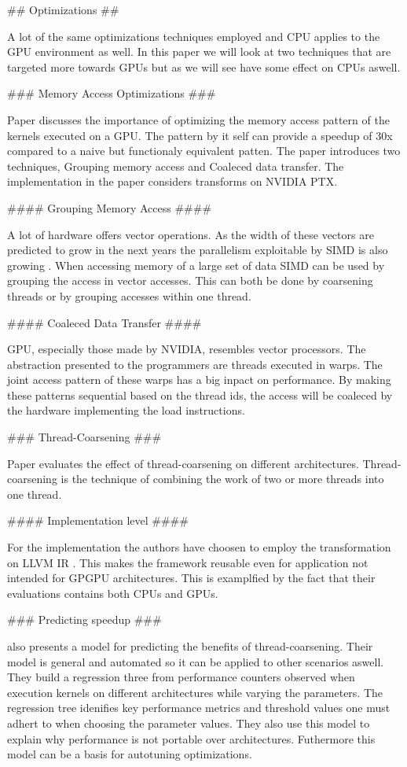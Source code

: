 \begin{markdown}

## Optimizations ##

A lot of the same optimizations techniques employed and CPU applies to
the GPU environment as well. In this paper we will look at two
techniques that are targeted more towards GPUs but as we will see have
some effect on CPUs aswell. 

### Memory Access Optimizations ###

Paper \cite{mem-acc} discusses the importance of optimizing the memory
access pattern of the kernels executed on a GPU. The pattern by it
self can provide a speedup of 30x compared to a naive but functionaly
equivalent patten. The paper introduces two techniques, Grouping
memory access and Coaleced data transfer. The implementation in the
paper considers transforms on NVIDIA PTX\cite{PTX}.

#### Grouping Memory Access ####

A lot of hardware offers vector operations. As the width of these
vectors are predicted to grow in the next years the parallelism
exploitable by SIMD is also growing \cite{Hennessy}. When accessing
memory of a large set of data SIMD can be used by grouping the access
in vector accesses. This can both be done by coarsening threads or by
grouping accesses within one thread.

#### Coaleced Data Transfer ####

GPU, especially those made by NVIDIA, resembles vector processors. The
abstraction presented to the programmers are threads executed in
warps. The joint access pattern of these warps has a big inpact on
performance. By making these patterns sequential based on the thread
ids, the access will be coaleced by the hardware implementing the load
instructions.

### Thread-Coarsening ###

Paper \cite{thd-coa} evaluates the effect of thread-coarsening on
different architectures. Thread-coarsening is the technique of
combining the work of two or more threads into one thread.

#### Implementation level ####

For the implementation the authors have choosen to employ the
transformation on LLVM IR \cite{LLVM}. This makes the framework
reusable even for application not intended for GPGPU
architectures. This is examplfied by the fact that their evaluations
contains both CPUs and GPUs.

### Predicting speedup ###

\cite{thd-coa} also presents a model for predicting the benefits of
thread-coarsening. Their model is general and automated so it can be
applied to other scenarios aswell. They build a regression three from
performance counters observed when execution kernels on different
architectures while varying the parameters. The regression tree
idenifies key performance metrics and threshold values one must adhert
to when choosing the parameter values. They also use this model to
explain why performance is not portable over architectures. Futhermore
this model can be a basis for autotuning optimizations. 

\end{markdown}


